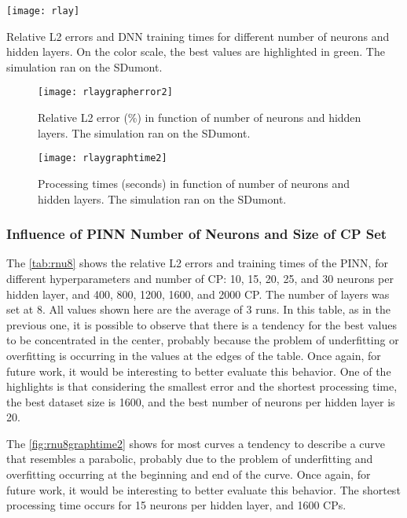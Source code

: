 \documentclass[conference]{IEEEtran}
\begin{document}
\begin{table}[htb]\centering
\texttt{[image: rlay]}
\caption{Relative L2 errors and DNN training times for different number of neurons and hidden layers. On the color scale, the best values are highlighted in green. The simulation ran on the SDumont.}
\label{tab:resu1}
\end{table}

\begin{figure}[htb]\centering
\texttt{[image: rlaygrapherror2]}
\caption{Relative L2 error (\%) in function of number of neurons and hidden layers. The simulation ran on the SDumont.}
\label{fig:rlaygrapherror2}
\end{figure}

\begin{figure}[htb]\centering
\texttt{[image: rlaygraphtime2]}
\caption{Processing times (seconds) in function of number of neurons and hidden layers. The simulation ran on the SDumont.}
\label{fig:rlaygraptime2}
\end{figure}

\subsubsection{Influence of PINN Number of Neurons and Size of CP Set}

The \autoref{tab:rnu8} shows the relative L2 errors and training times of the PINN, for different hyperparameters and number of CP: 10, 15, 20, 25, and 30 neurons per hidden layer, and 400, 800, 1200, 1600, and 2000 CP. The number of layers was set at 8. All values shown here are the average of 3 runs. In this table, as in the previous one, it is possible to observe that there is a tendency for the best values to be concentrated in the center, probably because the problem of underfitting or overfitting is occurring in the values at the edges of the table. Once again, for future work, it would be interesting to better evaluate this behavior. One of the highlights is that considering the smallest error and the shortest processing time, the best dataset size is 1600, and the best number of neurons per hidden layer is 20.

The \autoref{fig:rnu8graphtime2} shows for most curves a tendency to describe a curve that resembles a parabolic, probably due to the problem of underfitting and overfitting occurring at the beginning and end of the curve. Once again, for future work, it would be interesting to better evaluate this behavior. The shortest processing time occurs for 15 neurons per hidden layer, and 1600 CPs.
\end{document}
